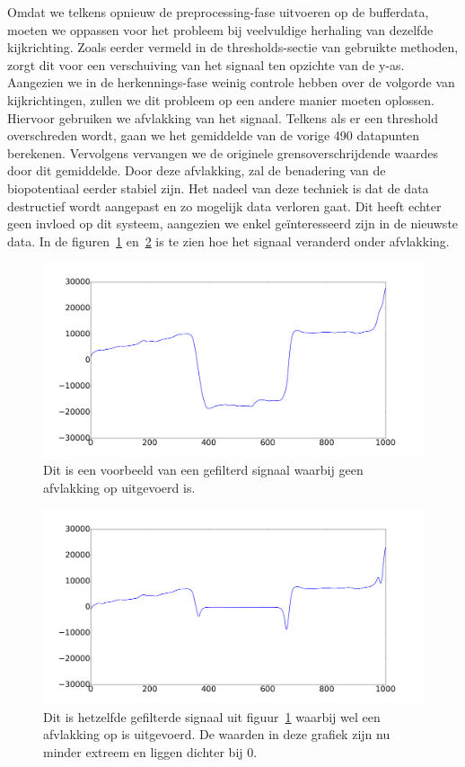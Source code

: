 \documentclass{article}
\begin{document}
Omdat we telkens opnieuw de preprocessing-fase uitvoeren op de bufferdata, moeten we oppassen voor het probleem bij veelvuldige herhaling van dezelfde kijkrichting. Zoals eerder vermeld in de thresholds-sectie van gebruikte methoden, zorgt dit voor een verschuiving van het signaal ten opzichte van de y-as. Aangezien we in de herkennings-fase weinig controle hebben over de volgorde van kijkrichtingen, zullen we dit probleem op een andere manier moeten oplossen. Hiervoor gebruiken we afvlakking van het signaal. Telkens als er een threshold overschreden wordt, gaan we het gemiddelde van de vorige 490 datapunten berekenen. Vervolgens vervangen we de originele grensoverschrijdende waardes door dit gemiddelde. Door deze afvlakking, zal de benadering van de biopotentiaal eerder stabiel zijn. Het nadeel van deze techniek is dat de data destructief wordt aangepast en zo mogelijk data verloren gaat. Dit heeft echter geen invloed op dit systeem, aangezien we enkel geïnteresseerd zijn in de nieuwste data. In de figuren~\ref{fig:afvlakking_original} en~\ref{fig:afvlakking} is te zien hoe het signaal veranderd onder afvlakking.

\begin{figure}[h]
\centering
\includegraphics[width=\linewidth]{images/afvlakking_original}
\caption{Dit is een voorbeeld van een gefilterd signaal waarbij geen afvlakking op uitgevoerd is.}
\label{fig:afvlakking_original}
\end{figure}

\begin{figure}[h]
\centering
\includegraphics[width=\linewidth]{images/afvlakking}
\caption{Dit is hetzelfde gefilterde signaal uit figuur~\ref{fig:afvlakking_original} waarbij wel een afvlakking op is uitgevoerd. De waarden in deze grafiek zijn nu minder extreem en liggen dichter bij 0.}
\label{fig:afvlakking}
\end{figure}
\end{document}
